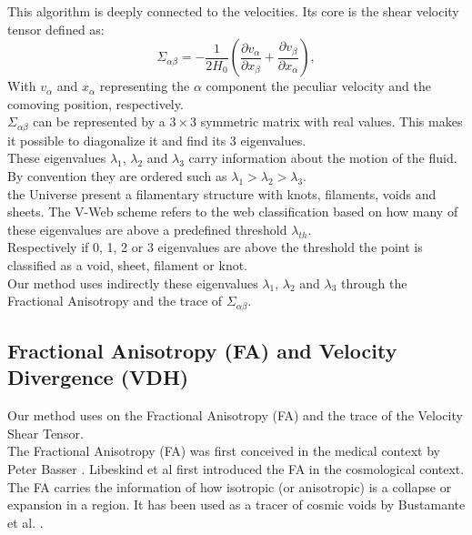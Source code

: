 \documentclass[12pt]{article}
\begin{document}
This algorithm is deeply
  connected to the velocities. Its core is the
   shear velocity tensor  defined as:\\
$$
\Sigma _{\alpha\beta} = -\frac{1}{2 H_0} \left( \frac{\partial v_{\alpha}}{\partial x_{\beta}} + \frac{\partial v_{\beta}}{\partial x_{\alpha}} \right) ,
$$
With $v_{\alpha}$ and $x_{\alpha}$ representing the $\alpha$ component the peculiar velocity and the comoving position, respectively.  \\

$\Sigma _{\alpha\beta}$ can be represented by a $3 \times
 3$ symmetric matrix with real values. This makes it
  possible to diagonalize it and find its 3 eigenvalues.\\
These eigenvalues $\lambda_1$, $\lambda_2$ and
 $\lambda_3$ carry information about the motion of the
 fluid. By convention they are ordered such as
  $\lambda_1 > \lambda_2 >\lambda_3$. \\
  the Universe present a filamentary structure with knots,
   filaments, voids and sheets. The V-Web scheme
   refers to the web classification based on how many of
    these eigenvalues are above a predefined threshold $
     \lambda_{th}$.\\
     Respectively if 0, 1, 2 or 3 eigenvalues are above
      the threshold the point is classified as a void,
       sheet, filament or knot. \\
       
Our method uses indirectly these eigenvalues $\lambda_1$, $\lambda_2$ and
 $\lambda_3$ through the
 Fractional Anisotropy and the trace of 
 $\Sigma _{\alpha\beta}$.


\subsection{Fractional Anisotropy (FA) and Velocity Divergence (VDH)}
\label{sec:FA_trace}

Our method uses on the Fractional Anisotropy (FA) and the trace of the Velocity Shear Tensor.\\


The Fractional Anisotropy (FA) was first conceived in the
 medical context by Peter Basser
  \cite{basser_inferring_1995}. Libeskind et al
   \cite{libeskind_velocity_2013} first introduced the FA
    in the cosmological context. The FA carries the information of how isotropic (or anisotropic) is a collapse or expansion in a region. It has been used as
    a tracer of cosmic voids by Bustamante et al.
     \cite{bustamante_tensor_2015}.\\
    
\end{document}
